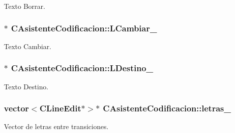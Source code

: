 Texto Borrar. 

\subsubsection[{\texorpdfstring{L\+Cambiar\+\_\+}{LCambiar_}}]{$\ast$ C\+Asistente\+Codificacion\+::\+L\+Cambiar\+\_\+\hspace{0.3cm}{\ttfamily [private]}}\hypertarget{classCAsistenteCodificacion_af6fcb3e27669afa7b4cc3a3916e90ea3}{}\label{classCAsistenteCodificacion_af6fcb3e27669afa7b4cc3a3916e90ea3}


Texto Cambiar. 

\subsubsection[{\texorpdfstring{L\+Destino\+\_\+}{LDestino_}}]{$\ast$ C\+Asistente\+Codificacion\+::\+L\+Destino\+\_\+\hspace{0.3cm}{\ttfamily [private]}}\hypertarget{classCAsistenteCodificacion_a666efef7460347c564d7a73322ed435c}{}\label{classCAsistenteCodificacion_a666efef7460347c564d7a73322ed435c}


Texto Destino. 

\subsubsection[{\texorpdfstring{letras\+\_\+}{letras_}}]{\setlength{\rightskip}{0pt plus 5cm}vector$<${\bf C\+Line\+Edit}$\ast$$>$$\ast$ C\+Asistente\+Codificacion\+::letras\+\_\+\hspace{0.3cm}{\ttfamily [private]}}\hypertarget{classCAsistenteCodificacion_ac96318b5bc263836fb7d27269965e7c5}{}\label{classCAsistenteCodificacion_ac96318b5bc263836fb7d27269965e7c5}


Vector de letras entre transiciones. 

